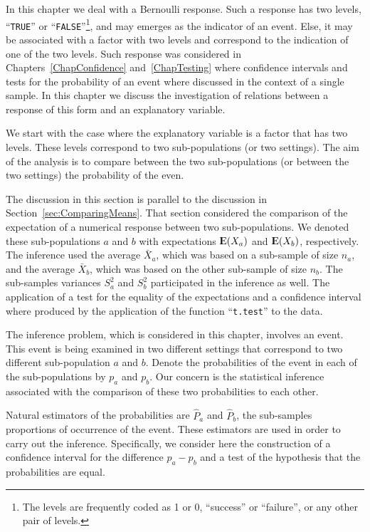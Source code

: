 \documentclass[]{krantz}
\newcommand{\Expec}{{\rm I\kern-.3em E}}
\theoremstyle{definition}
\theoremstyle{definition}
\theoremstyle{definition}
\theoremstyle{remark}
\begin{document}
In this chapter we deal with a Bernoulli response. Such a response has
two levels, ``\texttt{TRUE}'' or ``\texttt{FALSE}''\footnote{The levels are frequently coded as 1 or 0, ``success'' or ``failure'',
  or any other pair of levels.}, and may emerges as the indicator
of an event. Else, it may be associated with a factor with two levels
and correspond to the indication of one of the two levels. Such response
was considered in Chapters~\ref{ChapConfidence} and~\ref{ChapTesting} where
confidence intervals and tests for the probability of an event where
discussed in the context of a single sample. In this chapter we discuss
the investigation of relations between a response of this form and an
explanatory variable.

We start with the case where the explanatory variable is a factor that
has two levels. These levels correspond to two sub-populations (or two
settings). The aim of the analysis is to compare between the two
sub-populations (or between the two settings) the probability of the
even.

The discussion in this section is parallel to the discussion in
Section~\ref{sec:ComparingMeans}. That section considered the comparison of
the expectation of a numerical response between two sub-populations. We
denoted these sub-populations \(a\) and \(b\) with expectations
\(\Expec(X_a)\) and \(\Expec(X_b)\), respectively. The inference used the
average \(\bar X_a\), which was based on a sub-sample of size \(n_a\), and
the average \(\bar X_b\), which was based on the other sub-sample of size
\(n_b\). The sub-samples variances \(S^2_a\) and \(S^2_b\) participated in the
inference as well. The application of a test for the equality of the
expectations and a confidence interval where produced by the application
of the function ``\texttt{t.test}'' to the data.

The inference problem, which is considered in this chapter, involves an
event. This event is being examined in two different settings that
correspond to two different sub-population \(a\) and \(b\). Denote the
probabilities of the event in each of the sub-populations by \(p_a\) and
\(p_b\). Our concern is the statistical inference associated with the
comparison of these two probabilities to each other.

Natural estimators of the probabilities are \(\hat P_a\) and \(\hat P_b\),
the sub-samples proportions of occurrence of the event. These estimators
are used in order to carry out the inference. Specifically, we consider
here the construction of a confidence interval for the difference
\(p_a - p_b\) and a test of the hypothesis that the probabilities are
equal.
\end{document}
